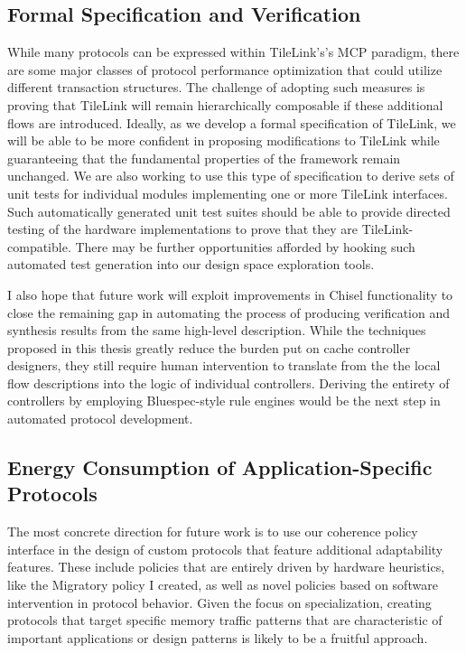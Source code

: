 \subsection{Formal Specification and Verification}

While many protocols can be expressed within TileLink's's MCP paradigm,
there are some major classes of protocol performance optimization that could
utilize different transaction structures.
The challenge of adopting such measures is proving that TileLink will remain hierarchically composable
if these additional flows are introduced.
Ideally, as we develop a formal specification of TileLink, we will be able to be more confident
in proposing modifications to TileLink while guaranteeing that the fundamental properties of the framework remain unchanged.
We are also working to use this type of specification to derive sets of unit tests for individual modules
implementing one or more TileLink interfaces.
Such automatically generated unit test suites should be able to provide directed
testing of the hardware implementations to prove that they are TileLink-compatible.
There may be further opportunities afforded by hooking such automated test generation into our design space exploration tools.

I also hope that future work will exploit improvements in Chisel functionality to close the remaining gap in
automating the process of producing verification and synthesis results from the same high-level description.
While the techniques proposed in this thesis greatly reduce the burden put on cache controller designers,
they still require human intervention to translate from the the local flow descriptions into the logic of individual controllers.
Deriving the entirety of controllers by employing Bluespec-style rule engines would be the next step in
automated protocol development.

\subsection{Energy Consumption of Application-Specific Protocols}

The most concrete direction for future work is to use our coherence policy interface
in the design of custom protocols that feature additional adaptability features.
These include policies that are entirely driven by hardware heuristics, like the Migratory policy
I created, as well as novel policies based on software intervention in protocol behavior.
Given the focus on specialization, creating protocols that target specific memory traffic patterns that are
characteristic of important applications or design patterns is likely to be a fruitful approach.

